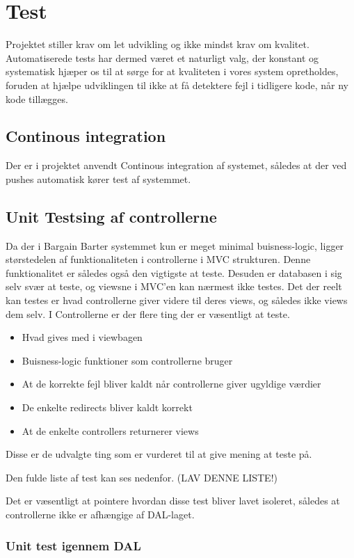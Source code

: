 \chapter{Test}

Projektet stiller krav om let udvikling og ikke mindst krav om kvalitet. Automatiserede tests har dermed været et naturligt valg, der konstant og systematisk hjæper os til at sørge for at kvaliteten i vores system opretholdes, foruden at hjælpe udviklingen til ikke at få detektere fejl i tidligere kode, når ny kode tillægges.

\section{Continous integration}
Der er i projektet anvendt Continous integration af systemet, således at der ved pushes automatisk kører test af systemmet.

\section{Unit Testsing af controllerne}
Da der i Bargain Barter systemmet kun er meget minimal buisness-logic, ligger størstedelen af funktionaliteten i controllerne i MVC strukturen. Denne funktionalitet er således også den vigtigste at teste. Desuden er databasen i sig selv svær at teste, og viewsne i MVC'en kan nærmest ikke testes. Det der reelt kan testes er hvad controllerne giver videre til deres views, og således ikke views dem selv. I Controllerne er der flere ting der er væsentligt at teste.
\begin{itemize}
	\item Hvad gives med i viewbagen
	\item Buisness-logic funktioner som controllerne bruger
	\item At de korrekte fejl bliver kaldt når controllerne giver ugyldige værdier
	\item De enkelte redirects bliver kaldt korrekt
	\item At de enkelte controllers returnerer views
\end{itemize}       
Disse er de udvalgte ting som er vurderet til at give mening at teste på.

Den fulde liste af test kan ses nedenfor.
(LAV DENNE LISTE!)

Det er væsentligt at pointere hvordan disse test bliver lavet isoleret, således at controllerne ikke er afhængige af DAL-laget.

\subsection{Unit test igennem DAL}

